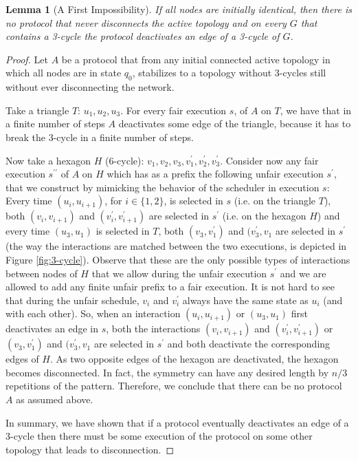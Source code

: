 \documentclass[preprint]{elsarticle}
\newcommand{\dprime}{{\prime\prime}}
\newtheorem{lemma}{Lemma}
\begin{document}
\begin{lemma} [A First Impossibility] \label{lem:first-impossibility}
If all nodes are initially identical, then there is no protocol that never disconnects the active topology and on every $G$ that contains a 3-cycle the protocol deactivates an edge of a 3-cycle of $G$.
\end{lemma}
\begin{proof}
Let $A$ be a protocol that from any initial connected active topology in which all nodes are in state $q_0$, stabilizes to
a topology without 3-cycles still without ever disconnecting the network.

Take a triangle $T$: $u_1,u_2,u_3$. For every fair execution $s$, of $A$ on $T$, we have that in a finite number of steps $A$ deactivates some
edge of the triangle, because it has to break the 3-cycle in a finite number of steps. 

Now take a hexagon $H$ (6-cycle): $v_1,v_2,v_3,v_1^\prime,v_2^\prime,v_3^\prime$. Consider now any fair execution $s^{\dprime}$ of $A$ on $H$ which has as a prefix the following unfair execution $s^\prime$, that we construct by mimicking the behavior of the scheduler in execution $s$: Every time $(u_i,u_{i+1})$, for $i\in\{1,2\}$, is selected in $s$ (i.e. on the triangle $T$), both $(v_i,v_{i+1})$ and $(v_i^\prime,v_{i+1}^\prime)$ are selected in $s^\prime$ (i.e. on the hexagon $H$) and every time $(u_3,u_1)$ is selected in $T$, both $(v_3,v_1^\prime)$ and $(v_3^\prime,v_1$ are selected in $s^\prime$ (the way the interactions are matched between the two executions, is depicted in Figure \ref{fig:3-cycle}). Observe that these are the only possible types of interactions between nodes of $H$ that we allow during the unfair execution $s^\prime$ and we are allowed to add any finite unfair prefix to a fair execution. It is not hard to see that during the unfair schedule, $v_i$ and $v_i^\prime$ always have the same state as $u_i$ (and with each other). So, when an interaction $(u_i,u_{i+1})$ or $(u_3,u_1)$ first deactivates an edge in $s$, both the interactions $(v_i,v_{i+1})$ and $(v_i^\prime,v_{i+1}^\prime)$ or $(v_3,v_1^\prime)$ and $(v_3^\prime,v_1$ are selected in $s^\prime$ and both deactivate the corresponding edges of $H$. As two opposite edges of the hexagon are deactivated, the hexagon becomes disconnected. In fact, the symmetry can have any desired length by $n/3$ repetitions of the pattern. Therefore, we conclude that there can be no protocol $A$ as assumed above.

In summary, we have shown that if a protocol eventually deactivates an edge of a 3-cycle then there must be some execution of the protocol on some other topology that leads to disconnection.
\end{proof}
\end{document}
